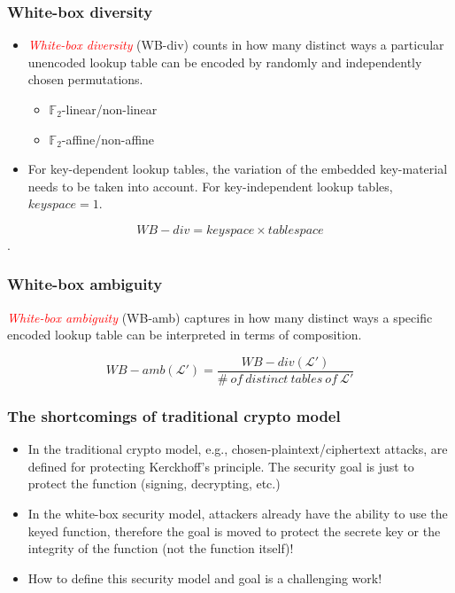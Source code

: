 \documentclass[aspectratio=169,xcolor=dvipsnames]{beamer}
\begin{document}
\frame
{
\frametitle{White-box diversity}
\begin{itemize}
\item \textcolor{red}{\textsl{White-box diversity}} (WB-div) counts in how many distinct ways a particular unencoded lookup table can be encoded by randomly and independently chosen permutations.

\begin{itemize}
\item $\mathbb{F}_{2}$-linear/non-linear
\item $\mathbb{F}_{2}$-affine/non-affine
\end{itemize}

\item For key-dependent lookup tables, the variation of the embedded key-material needs to be taken into account. For key-independent lookup tables, $keyspace=1$.
\end{itemize}

\[WB-div = keyspace \times tablespace\].

}

\frame
{
\frametitle{White-box ambiguity}
\textcolor{red}{\textsl{White-box ambiguity}} (WB-amb) captures in how many distinct ways a specific encoded lookup table can be interpreted in terms of composition.

\[ WB-amb(\mathcal{L'}) = \frac{WB-div(\mathcal{L'})}{\# \ of \ distinct \  tables \ of \ \mathcal{L'}}\]
}

\frame
{
\frametitle{The shortcomings of traditional crypto model}
\begin{itemize}
 \setlength{\itemsep}{12pt}

 \item In the traditional crypto model, e.g., chosen-plaintext/ciphertext attacks, are defined for protecting Kerckhoff's principle. The security goal is just to
 protect the function (signing, decrypting, etc.)

 \item In the white-box security model, attackers already have the ability to use the keyed function, therefore the goal is moved to protect the secrete key or the integrity of the function (not the function itself)!

 \item How to define this security model and goal is a challenging work!

\end{itemize}

}
\end{document}
